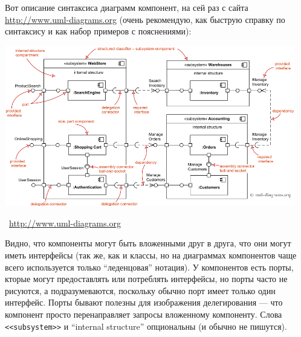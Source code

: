 \documentclass[a5paper]{article}
\newcommand{\attribution}[1] {
	\vspace{-5mm}\begin{flushright}\begin{scriptsize}%
	{\textcopyright\, #1}\end{scriptsize}\end{flushright}
}
\begin{document}
Вот описание синтаксиса диаграмм компонент, на сей раз с сайта \url{http://www.uml-diagrams.org} (очень рекомендую, как быструю справку по синтаксису и как набор примеров с пояснениями):

\begin{center}
	\includegraphics[width=0.95\textwidth]{componentDiagramsOverview.png}
	\attribution{\url{http://www.uml-diagrams.org}}
\end{center}

Видно, что компоненты могут быть вложенными друг в друга, что они могут иметь интерфейсы (так же, как и классы, но на диаграммах компонентов чаще всего используется только ``леденцовая'' нотация). У компонентов есть порты, кторые могут предоставлять или потреблять интерфейсы, но порты часто не рисуются, а подразумеваются, поскольку обычно порт имеет только один интерфейс. Порты бывают полезны для изображения делегирования --- что компонент просто перенаправляет запросы вложенному компоненту. Слова \verb|<<subsystem>>| и ``internal structure'' опциональны (и обычно не пишутся).
\end{document}

